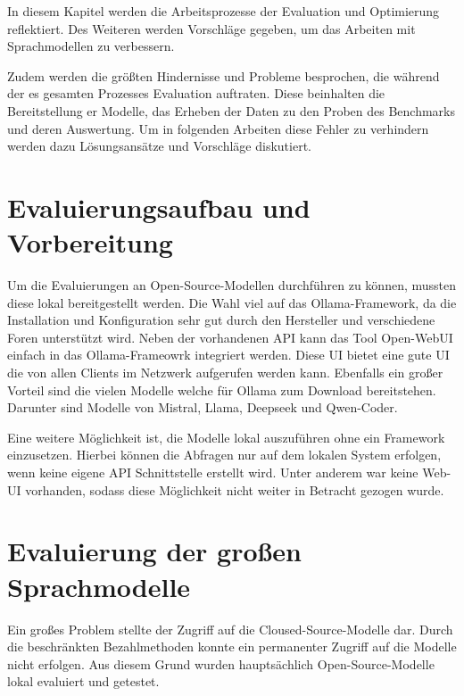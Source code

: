 In diesem Kapitel werden die Arbeitsprozesse der Evaluation und Optimierung reflektiert. Des Weiteren werden Vorschläge gegeben, um das Arbeiten mit Sprachmodellen zu verbessern.\vspace{0.2cm}

Zudem werden die größten Hindernisse und Probleme besprochen, die während der es gesamten Prozesses Evaluation auftraten. Diese beinhalten die Bereitstellung er Modelle, das Erheben der Daten zu den Proben des Benchmarks und deren Auswertung. Um in folgenden Arbeiten diese Fehler zu verhindern werden dazu Lösungsansätze und Vorschläge diskutiert.



\section{Evaluierungsaufbau und Vorbereitung}
Um die Evaluierungen an Open-Source-Modellen durchführen zu können, mussten diese lokal bereitgestellt werden. Die Wahl viel auf das Ollama-Framework, da die Installation und Konfiguration sehr gut durch den Hersteller und verschiedene Foren unterstützt wird. Neben der vorhandenen API kann das Tool Open-WebUI einfach in das Ollama-Frameowrk integriert werden. Diese UI bietet eine gute UI die von allen Clients im Netzwerk aufgerufen werden kann. Ebenfalls ein großer Vorteil sind die vielen Modelle welche für Ollama zum Download bereitstehen. Darunter sind Modelle von Mistral, Llama, Deepseek und Qwen-Coder.\vspace{0.2cm}

Eine weitere Möglichkeit ist, die Modelle lokal auszuführen ohne ein Framework einzusetzen. Hierbei können die Abfragen nur auf dem lokalen System erfolgen, wenn keine eigene API Schnittstelle erstellt wird. Unter anderem war keine Web-UI vorhanden, sodass diese Möglichkeit nicht weiter in Betracht gezogen wurde.\vspace{0.2cm}



\section{Evaluierung der großen Sprachmodelle}
Ein großes Problem stellte der Zugriff auf die Cloused-Source-Modelle dar. Durch die beschränkten Bezahlmethoden konnte ein permanenter Zugriff auf die Modelle nicht erfolgen. Aus diesem Grund wurden hauptsächlich Open-Source-Modelle lokal evaluiert und getestet.


